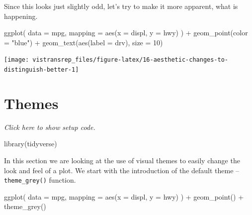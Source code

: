 \documentclass[]{book}
\newenvironment{Shaded}{}{}
\newcommand{\DataTypeTok}[1]{#1}
\newcommand{\DecValTok}[1]{#1}
\newcommand{\KeywordTok}[1]{\textcolor[rgb]{0.00,0.00,1.00}{#1}}
\newcommand{\NormalTok}[1]{#1}
\newcommand{\OperatorTok}[1]{#1}
\newcommand{\StringTok}[1]{\textcolor[rgb]{0.00,0.50,0.50}{#1}}
\begin{document}
Since this looks just slightly odd, let's try to make it more apparent, what is happening.

\begin{Shaded}
\begin{Highlighting}[]
\KeywordTok{ggplot}\NormalTok{(}
  \DataTypeTok{data =}\NormalTok{ mpg,}
  \DataTypeTok{mapping =} \KeywordTok{aes}\NormalTok{(}\DataTypeTok{x =}\NormalTok{ displ, }\DataTypeTok{y =}\NormalTok{ hwy)}
\NormalTok{) }\OperatorTok{+}
\StringTok{  }\KeywordTok{geom_point}\NormalTok{(}\DataTypeTok{color =} \StringTok{"blue"}\NormalTok{) }\OperatorTok{+}
\StringTok{  }\KeywordTok{geom_text}\NormalTok{(}\KeywordTok{aes}\NormalTok{(}\DataTypeTok{label =}\NormalTok{ drv), }\DataTypeTok{size =} \DecValTok{10}\NormalTok{)}
\end{Highlighting}
\end{Shaded}

\begin{flushright}\texttt{[image: vistransrep\_files/figure-latex/16-aesthetic-changes-to-distinguish-better-1]} \end{flushright}

\hypertarget{themes}{%
\section{Themes}\label{themes}}

\emph{Click here to show setup code.}

\begin{Shaded}
\begin{Highlighting}[]
\KeywordTok{library}\NormalTok{(tidyverse)}
\end{Highlighting}
\end{Shaded}

In this section we are looking at the use of visual themes to easily change the look and feel of a plot.
We start with the introduction of the default theme -- \texttt{theme\_grey()} function.

\begin{Shaded}
\begin{Highlighting}[]
\KeywordTok{ggplot}\NormalTok{(}
  \DataTypeTok{data =}\NormalTok{ mpg,}
  \DataTypeTok{mapping =} \KeywordTok{aes}\NormalTok{(}\DataTypeTok{x =}\NormalTok{ displ, }\DataTypeTok{y =}\NormalTok{ hwy)}
\NormalTok{) }\OperatorTok{+}
\StringTok{  }\KeywordTok{geom_point}\NormalTok{() }\OperatorTok{+}
\StringTok{  }\KeywordTok{theme_grey}\NormalTok{()}
\end{Highlighting}
\end{Shaded}
\end{document}
